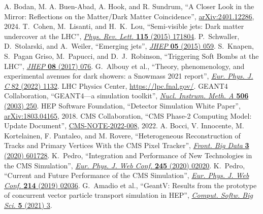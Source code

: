 \begin{thebibliography}{99}
 A. Bodan, M. A. Buen-Abad, A. Hook, and R. Sundrum, ``A Closer Look in the Mirror: Reflections on the Matter/Dark Matter Coincidence'', \href{https://arxiv.org/abs/2401.12286}{arXiv:2401.12286}, 2024.
 T.~Cohen, M.~Lisanti, and H.~K.~Lou, ``Semi-visible jets: Dark matter undercover at the {LHC}'', \href{https://doi.org/10.1103/PhysRevLett.115.171804}{\textit{Phys. Rev. Lett.} \textbf{115} (2015) 171804}.
 P.~Schwaller, D.~Stolarski, and A.~Weiler, ``Emerging jets'', \href{http://dx.doi.org/10.1007/JHEP05(2015)059}{\textit{JHEP} \textbf{05} (2015) 059}.
 S.~Knapen, S.~Pagan Griso, M.~Papucci, and D.~J.~Robinson, ``Triggering Soft Bombs at the LHC'', \href{http://dx.doi.org/10.1007/JHEP08(2017)076}{\textit{JHEP} \textbf{08} (2017) 076}.
 G.~Albouy et al., ``Theory, phenomenology, and experimental avenues for dark showers: a Snowmass 2021 report'', \href{https://doi.org/10.1140/epjc/s10052-022-11048-8}{\textit{Eur. Phys. J. C} 82 (2022) 1132}.
 LHC Physics Center, \href{https://lpc.fnal.gov/}{https://lpc.fnal.gov/}.
 {GEANT4} Collaboration, ``{GEANT4}---a simulation toolkit'', \href{http://dx.doi.org/10.1016/S0168-9002(03)01368-8}{\textit{Nucl. Instrum. Meth. A} \textbf{506} (2003) 250}.
 HEP Software Foundation, ``Detector Simulation White Paper'', \href{https://arxiv.org/abs/1803.04165}{arXiv:1803.04165}, 2018.
 CMS Collaboration, ``CMS Phase-2 Computing Model: Update Document'', \href{https://cds.cern.ch/record/2815292}{CMS-NOTE-2022-008}, 2022.
 A. Bocci, V. Innocente, M. Kortelainen, F. Pantaleo, and M. Rovere, ``Heterogeneous Reconstruction of Tracks and Primary Vertices With the CMS Pixel Tracker'', \href{https://doi.org/10.3389/fdata.2020.601728}{\textit{Front. Big Data} \textbf{3} (2020) 601728}.
 K.~Pedro, ``Integration and Performance of New Technologies in the CMS Simulation'', \href{https://doi.org/10.1051/epjconf/202024502020}{\textit{Eur. Phys. J. Web Conf.} \textbf{245} (2020) 02020}.
 K.~Pedro, ``Current and Future Performance of the CMS Simulation'', \href{https://doi.org/10.1051/epjconf/201921402036}{\textit{Eur. Phys. J. Web Conf.} \textbf{214} (2019) 02036}.
 G.~Amadio et al., ``GeantV: Results from the prototype of concurrent vector particle transport simulation in HEP'', \href{https://doi.org/10.1007/s41781-020-00048-6}{\textit{Comput. Softw. Big Sci.} \textbf{5} (2021) 3}.

\end{thebibliography}
